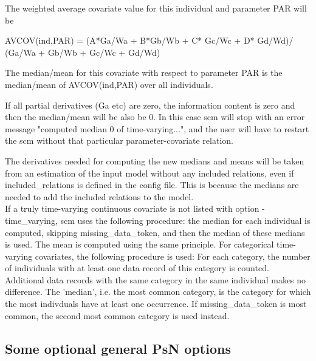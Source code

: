 \begin{optionlist}
The weighted average covariate value for this individual and parameter PAR
will be

AVCOV(ind,PAR) = (A*Ga/Wa + B*Gb/Wb + C* Gc/Wc + D* Gd/Wd)/
(Ga/Wa + Gb/Wb + Gc/Wc + Gd/Wd)

The median/mean for this covariate with respect to parameter PAR
is the median/mean of AVCOV(ind,PAR) over all individuals.

If all partial derivatives (Ga etc) are zero, the information content is zero
and then the median/mean will be also be 0.
In this case scm will stop with an error message "computed median 0 of time-varying...",
and the user will have to restart the scm without that particular parameter-covariate relation.

The derivatives needed for computing the new medians and means will be taken from an estimation of the input model without any included relations, even if included\_relations is defined in the config file. This is because the medians are needed to add the included relations to the model.\\



If a truly time-varying continuous
covariate is not listed with option -time\_varying, scm uses the following procedure:
the median for each individual is computed, 
skipping missing\_data\_token, and then the median of these medians is used. The mean is computed using the same principle.
For categorical time-varying covariates, the following procedure is used:
For each category, the number of individuals with at least one data record of this category is counted. Additional data records with 
the same category in the same individual makes no difference.
The 'median', i.e. the most common category, is the category for which the most indivduals have at least one occurrence. 
If missing\_data\_token is most common, the second most common category is used instead.

\nextopt
\end{optionlist}

\subsection{Some optional general PsN options}

\begin{optionlist}

\end{optionlist}


